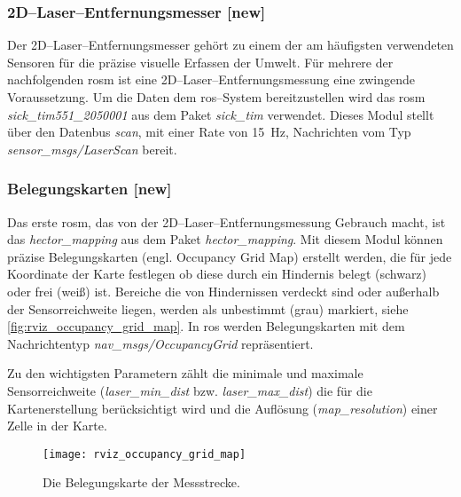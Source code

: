\begin{comment}
--------------------------------------------------------------------------------
- \url{http://wiki.ros.org/sick_tim}
\end{comment}
\subsubsection{2D--Laser--Entfernungsmesser [new]}

Der 2D--Laser--Entfernungsmesser gehört zu einem der am häufigsten verwendeten Sensoren für die präzise visuelle Erfassen der Umwelt. Für mehrere der nachfolgenden \Gls{rosm} ist eine 2D--Laser--Entfernungsmessung eine zwingende Voraussetzung. Um die Daten dem \Gls{ros}--System bereitzustellen wird das \Gls{rosm} \textit{sick\_tim551\_2050001} aus dem Paket \textit{sick\_tim} verwendet. Dieses Modul stellt über den Datenbus \textit{scan}, mit einer Rate von \SI{15}{\hertz}, Nachrichten vom Typ \textit{sensor\_msgs/LaserScan} bereit.


\begin{comment}
--------------------------------------------------------------------------------
- \url{http://wiki.ros.org/hector_mapping}
\end{comment}
\subsubsection{Belegungskarten [new]}

Das erste \Gls{rosm}, das von der 2D--Laser--Entfernungsmessung Gebrauch macht, ist das \textit{hector\_mapping} aus dem Paket \textit{hector\_mapping}. Mit diesem Modul können präzise Belegungskarten (engl. Occupancy Grid Map) erstellt werden, die für jede Koordinate der Karte festlegen ob diese durch ein Hindernis belegt (schwarz) oder frei (weiß) ist. Bereiche die von Hindernissen verdeckt sind oder außerhalb der Sensorreichweite liegen, werden als unbestimmt (grau) markiert, siehe \autoref{fig:rviz_occupancy_grid_map}. In \Gls{ros} werden Belegungskarten mit dem Nachrichtentyp \textit{nav\_msgs/OccupancyGrid} repräsentiert.

Zu den wichtigsten Parametern zählt die minimale und maximale Sensorreichweite (\textit{laser\_min\_dist} bzw. \textit{laser\_max\_dist}) die für die Kartenerstellung berücksichtigt wird und die Auflösung (\textit{map\_resolution}) einer Zelle in der Karte.

\begin{figure}[h]
	\centering
	\texttt{[image: rviz\_occupancy\_grid\_map]}
	\caption{Die Belegungskarte der Messstrecke.}
	\label{fig:rviz_occupancy_grid_map}
\end{figure}
 

